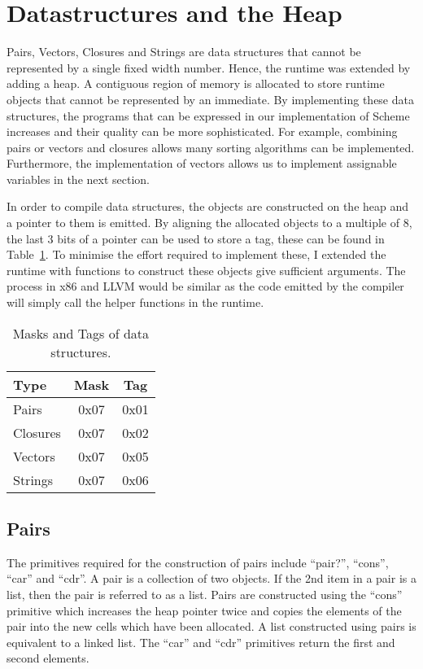 \documentclass{article}
\begin{document}
\section{Datastructures and the Heap}

Pairs, Vectors, Closures and Strings are data structures that cannot be represented by a single fixed width number. Hence, the runtime was extended by adding a heap. A contiguous region of memory is allocated to store runtime objects that cannot be represented by an immediate. By implementing these data structures, the programs that can be expressed in our implementation of Scheme increases and their quality can be more sophisticated. For example, combining pairs or vectors and closures allows many sorting algorithms can be implemented. Furthermore, the implementation of vectors allows us to implement assignable variables in the next section.

In order to compile data structures, the objects are constructed on the heap and a pointer to them is emitted. By aligning the allocated objects to a multiple of 8, the last 3 bits of a pointer can be used to store a tag, these can be found in Table~\ref{tab:datastructures}. To minimise the effort required to implement these, I extended the runtime with functions to construct these objects give sufficient arguments. The process in x86 and LLVM would be similar as the code emitted by the compiler will simply call the helper functions in the runtime.

\begin{table}[ht]
  \centering
\begin{tabular}{ l c c }
  \toprule
  Type & Mask & Tag  \\ \hline
  \midrule
  Pairs  & 0x07 & 0x01 \\
  Closures & 0x07 & 0x02 \\
  Vectors & 0x07 & 0x05 \\
  Strings & 0x07 & 0x06 \\
  \bottomrule
\end{tabular}
\caption{Masks and Tags of data structures.} \label{tab:datastructures}
\end{table}

\subsection{Pairs}

The primitives required for the construction of pairs include ``pair?'', ``cons'', ``car'' and ``cdr''. A pair is a collection of two objects. If the 2nd item in a pair is a list, then the pair is referred to as a list. Pairs are constructed using the ``cons'' primitive which increases the heap pointer twice and copies the elements of the pair into the new cells which have been allocated. A list constructed using pairs is equivalent to a linked list. The ``car'' and ``cdr'' primitives return the first and second elements.
\end{document}
